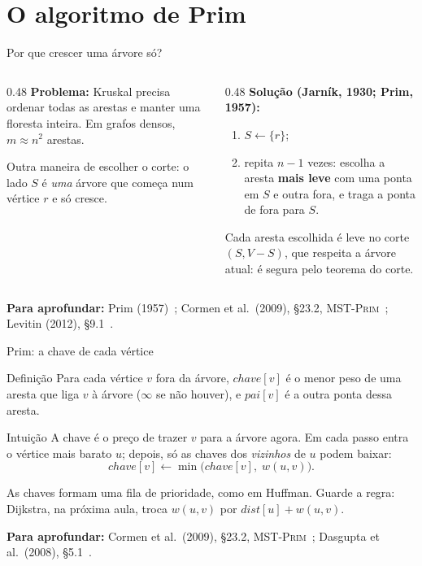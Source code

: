 \documentclass[aspectratio=169,xcolor=table]{beamer}
\newcommand{\fonte}[1]{%
  \vfill
  {\tiny\color{gray!55!black}\textbf{Para aprofundar:} #1\par}%
}
\begin{document}
\section{O algoritmo de Prim}

\begin{frame}{Por que crescer uma árvore só?}
  \begin{columns}[T]
    \begin{column}{0.48\textwidth}
      \textbf{Problema:} Kruskal precisa ordenar todas as arestas e manter uma floresta
      inteira. Em grafos densos, $m \approx n^2$ arestas.
      \medskip

      {\small Outra maneira de escolher o corte: o lado $S$ é \emph{uma} árvore que começa
      num vértice $r$ e só cresce.}
    \end{column}
    \begin{column}{0.48\textwidth}
      \textbf{Solução (Jarník, 1930; Prim, 1957):}
      \begin{enumerate}
        \small
        \item $S \gets \{r\}$;
        \item repita $n - 1$ vezes: escolha a aresta \textbf{mais leve} com uma ponta em $S$ e
              outra fora, e traga a ponta de fora para $S$.
      \end{enumerate}
      {\small Cada aresta escolhida é leve no corte $(S, V - S)$, que respeita a árvore
      atual: é segura pelo teorema do corte.}
    \end{column}
  \end{columns}
  \fonte{Prim (1957)~\cite{prim1957shortest}; Cormen et al.\ (2009), \S 23.2,
    \textsc{MST-Prim}~\cite{cormen2009introduction}; Levitin (2012),
    \S 9.1~\cite{levitin2012introduction}.}
\end{frame}

\begin{frame}{Prim: a chave de cada vértice}
  \begin{block}{Definição}
    \small Para cada vértice $v$ fora da árvore, $\mathit{chave}[v]$ é o menor peso de uma
    aresta que liga $v$ à árvore ($\infty$ se não houver), e $\mathit{pai}[v]$ é a outra ponta
    dessa aresta.
  \end{block}
  \begin{exampleblock}{Intuição}
    \small A chave é o preço de trazer $v$ para a árvore agora. Em cada passo entra o vértice
    mais barato $u$; depois, só as chaves dos \emph{vizinhos} de $u$ podem baixar:
    \[ \mathit{chave}[v] \gets \min\bigl(\mathit{chave}[v],\; w(u,v)\bigr) . \]
  \end{exampleblock}
  {\scriptsize As chaves formam uma fila de prioridade, como em Huffman. Guarde a regra:
  Dijkstra, na próxima aula, troca $w(u,v)$ por $\mathit{dist}[u] + w(u,v)$.\par}
  \fonte{Cormen et al.\ (2009), \S 23.2, \textsc{MST-Prim}~\cite{cormen2009introduction};
    Dasgupta et al.\ (2008), \S 5.1~\cite{dasgupta2008algorithms}.}
\end{frame}
\end{document}
